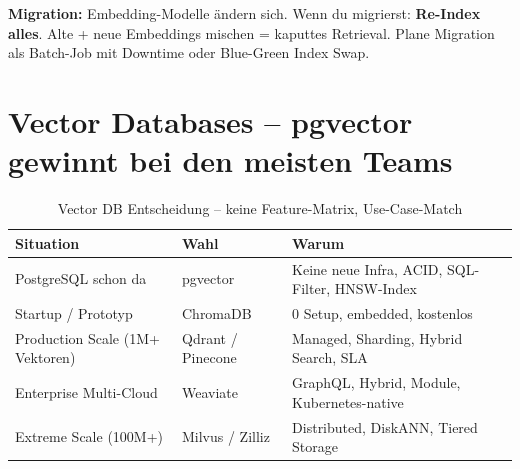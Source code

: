 



\par\mbox{}\par
\begin{praxishinweisEnv}
\textbf{Migration:} Embedding-Modelle ändern sich. Wenn du migrierst: \textbf{Re-Index alles}. Alte + neue Embeddings mischen = kaputtes Retrieval. Plane Migration als Batch-Job mit Downtime oder Blue-Green Index Swap.
\end{praxishinweisEnv}

\section{Vector Databases -- pgvector gewinnt bei den meisten Teams}

\begin{table}[H]
\centering
\begin{tabularx}{\linewidth}{lXX}
\toprule
\textbf{Situation} & \textbf{Wahl} & \textbf{Warum} \\
\midrule
PostgreSQL schon da & pgvector & Keine neue Infra, ACID, SQL-Filter, HNSW-Index \\
Startup / Prototyp & ChromaDB & 0 Setup, embedded, kostenlos \\
Production Scale (1M+ Vektoren) & Qdrant / Pinecone & Managed, Sharding, Hybrid Search, SLA \\
Enterprise Multi-Cloud & Weaviate & GraphQL, Hybrid, Module, Kubernetes-native \\
Extreme Scale (100M+) & Milvus / Zilliz & Distributed, DiskANN, Tiered Storage \\
\midrule
\end{tabularx}
\caption{Vector DB Entscheidung -- keine Feature-Matrix, Use-Case-Match}
\label{tab:vectordb-decision}
\end{table}


